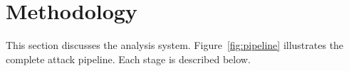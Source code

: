\documentclass[conference]{IEEEtran}
\begin{document}





\section{Methodology}\label{sec:methodology}

This section discusses the analysis system. Figure~\ref{fig:pipeline} illustrates the complete attack pipeline. Each stage is described below.
\end{document}
